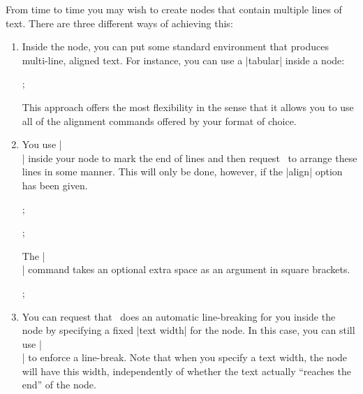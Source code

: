 From time to time you may wish to create nodes that contain multiple lines of
text. There are three different ways of achieving this:
%
\begin{enumerate}
    \item Inside the node, you can put some standard environment that produces
        multi-line, aligned text. For instance, you can use a |{tabular}|
        inside a node:
\begin{codeexample}[width=5cm]
\tikz {};
\end{codeexample}
        This approach offers the most flexibility in the sense that it allows
        you to use all of the alignment commands offered by your format of
        choice.
    \item You use |\\| inside your node to mark the end of lines and then
        request \tikzname\ to arrange these lines in some manner. This will
        only be done, however, if the |align| option has been given.
\begin{codeexample}[]
\tikz[align=left] ;
\end{codeexample}
\begin{codeexample}[]
\tikz[align=center] ;
\end{codeexample}
        The |\\| command takes an optional extra space as an argument in square
        brackets.
\begin{codeexample}[]
\tikz {};
\end{codeexample}
    \item You can request that \tikzname\ does an automatic line-breaking for
        you inside the node by specifying a fixed |text width| for the node. In
        this case, you can still use |\\| to enforce a line-break. Note that
        when you specify a text width, the node will have this width,
        independently of whether the text actually ``reaches the end'' of the
        node.
\end{enumerate}

